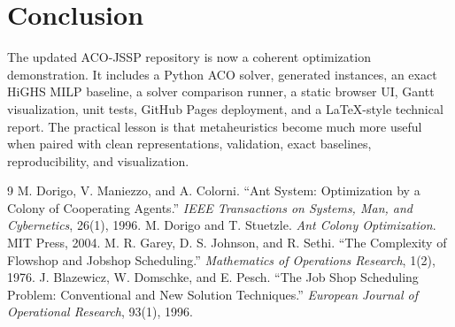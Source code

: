 \documentclass[11pt]{article}
\begin{document}
\section{Conclusion}
The updated ACO-JSSP repository is now a coherent optimization demonstration. It includes a Python ACO solver, generated instances, an exact HiGHS MILP baseline, a solver comparison runner, a static browser UI, Gantt visualization, unit tests, GitHub Pages deployment, and a LaTeX-style technical report. The practical lesson is that metaheuristics become much more useful when paired with clean representations, validation, exact baselines, reproducibility, and visualization.
\begin{thebibliography}{9}
 M. Dorigo, V. Maniezzo, and A. Colorni. ``Ant System: Optimization by a Colony of Cooperating Agents.'' \textit{IEEE Transactions on Systems, Man, and Cybernetics}, 26(1), 1996.
 M. Dorigo and T. Stuetzle. \textit{Ant Colony Optimization}. MIT Press, 2004.
 M. R. Garey, D. S. Johnson, and R. Sethi. ``The Complexity of Flowshop and Jobshop Scheduling.'' \textit{Mathematics of Operations Research}, 1(2), 1976.
 J. Blazewicz, W. Domschke, and E. Pesch. ``The Job Shop Scheduling Problem: Conventional and New Solution Techniques.'' \textit{European Journal of Operational Research}, 93(1), 1996.
\end{thebibliography}
\end{document}
